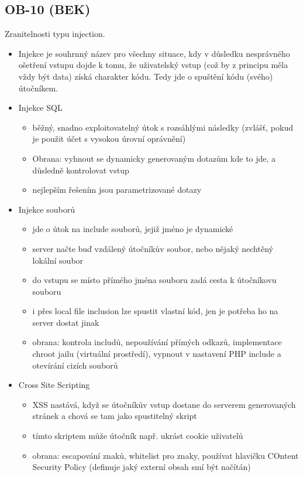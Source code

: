 \subsection{OB-10 (BEK)}
Zranitelnosti typu injection.

\begin{itemize}
    \item Injekce je souhrnný název pro všechny situace, kdy v důsledku nesprávného ošetření vstupu dojde k tomu, že uživatelský vstup (což by z principu měla vždy být data) získá charakter kódu. Tedy jde o spuštění kódu (svého) útočníkem.
    \item Injekce SQL
    \begin{itemize}
        \item běžný, snadno exploitovatelný útok s rozsáhlými následky (zvlášť, pokud je použit účet s vysokou úrovní oprávnění)
        \item Obrana: vyhnout se dynamicky generovaným dotazům kde to jde, a důsledně kontrolovat vstup
        \item nejlepším řešením jsou parametrizované dotazy
    \end{itemize}
    \item Injekce souborů
    \begin{itemize}
        \item jde o útok na include souborů, jejiž jméno je dynamické
        \item server načte buď vzdálený útočníkův soubor, nebo nějaký nechtěný lokální soubor
        \item do vstupu se místo přímého jména souboru zadá cesta k útočníkovu souboru
        \item i přes local file inclusion lze spustit vlastní kód, jen je potřeba ho na server dostat jinak
        \item obrana: kontrola includů, nepoužívání přímých odkazů, implementace chroot jailu (virtuální pros\-tře\-dí), vypnout v nastavení PHP include a otevírání cizích souborů
    \end{itemize}
    \item Cross Site Scripting
    \begin{itemize}
        \item XSS nastává, když se útočníkův vstup dostane do serverem generovaných stránek a chová se tam jako spustitelný skript
        \item tímto skriptem může útočník např. ukrást cookie uživatelů
        \item obrana: escapování znaků, whitelist pro znaky, používat hlavičku COntent Security Policy (definuje jaký externí obsah smí být načítán)
    \end{itemize}
\end{itemize}